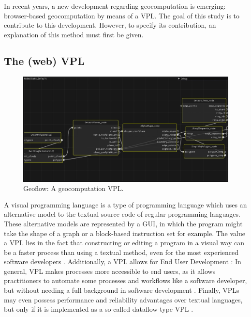 In recent years, a new development regarding geocomputation is emerging:
browser-based geocomputation by means of a \ac{VPL}.
The goal of this study is to contribute to this development. 
However, to specify its contribution, an explanation of this method must first be given.

\subsection*{The (web) VPL}

\begin{figure}
  \centering
  \graphicspath{{../../assets/images/background/geo-vpl/}}
  \includegraphics[width=\linewidth]{geoflow.png}
  \caption{Geoflow: A geocomputation VPL. \citep{peters_geoflow_2019}}
  \label{fig:1:geoflow}
\end{figure}

A visual programming language is a type of programming language which uses an alternative model to the textual source code of regular programming languages. 
These alternative models are represented by a \ac{GUI}, in which the program might take the shape of a graph or a block-based instruction set for example. 
The value a VPL lies in the fact that constructing or editing a program in a visual way can be a faster process than using a textual method, even for the most experienced software developers \citep{green_usability_1996, kuhail_characterizing_2021}.
Additionally, a \ac{VPL} allows for End User Development \citep{kuhail_characterizing_2021}: 
In general, \ac{VPL} makes processes more accessible to end users, as it allows practitioners to automate some processes and workflows like a software developer, but without needing a full background in software development \citep{benac_recent_2022}. 
Finally, VPLs may even possess performance and reliability advantages over textual languages, but only if it is implemented as a so-called dataflow-type VPL \citep{sousa_dataflow_2012}. 


